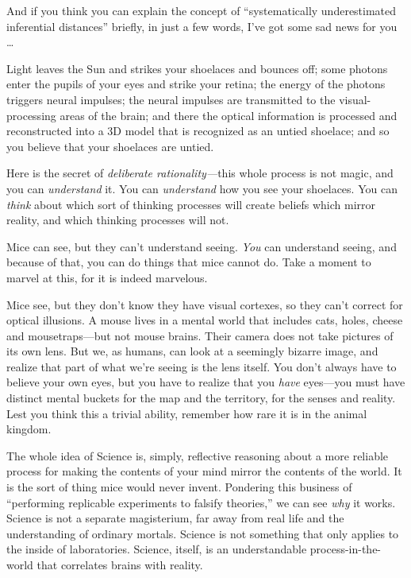 {
 And if you think you can explain the concept of
``systematically underestimated inferential
distances'' briefly, in just a few words,
I've got some sad news for you \ldots}

\myendsectiontext


{
 Light leaves the Sun and strikes your shoelaces and bounces off;
some photons enter the pupils of your eyes and strike your retina; the
energy of the photons triggers neural impulses; the neural impulses are
transmitted to the visual-processing areas of the brain; and there the
optical information is processed and reconstructed into a 3D model that
is recognized as an untied shoelace; and so you believe that your
shoelaces are untied. }

{
 Here is the secret of \textit{deliberate rationality---}this whole
process is not magic, and you can \textit{understand} it. You can
\textit{understand} how you see your shoelaces. You can \textit{think}
about which sort of thinking processes will create beliefs which mirror
reality, and which thinking processes will not.}

{
 Mice can see, but they can't understand seeing.
\textit{You} can understand seeing, and because of that, you can do
things that mice cannot do. Take a moment to marvel at this, for it is
indeed marvelous.}

{
 Mice see, but they don't know they have visual
cortexes, so they can't correct for optical illusions.
A mouse lives in a mental world that includes cats, holes, cheese and
mousetraps---but not mouse brains. Their camera does not take pictures
of its own lens. But we, as humans, can look at a seemingly bizarre
image, and realize that part of what we're seeing is
the lens itself. You don't always have to believe your
own eyes, but you have to realize that you \textit{have} eyes---you
must have distinct mental buckets for the map and the territory, for
the senses and reality. Lest you think this a trivial ability, remember
how rare it is in the animal kingdom.}

{
 The whole idea of Science is, simply, reflective reasoning about a
more reliable process for making the contents of your mind mirror the
contents of the world. It is the sort of thing mice would never invent.
Pondering this business of ``performing replicable
experiments to falsify theories,'' we can see
\textit{why} it works. Science is not a separate magisterium, far away
from real life and the understanding of ordinary mortals. Science is
not something that only applies to the inside of laboratories. Science,
itself, is an understandable process-in-the-world that correlates
brains with reality.}

